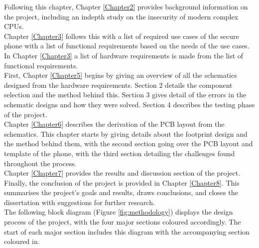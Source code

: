 Following this chapter, Chapter \ref{Chapter2} provides background information on the project, including an indepth study on the insecurity of modern complex CPUs.\\ 
Chapter \ref{Chapter3} follows this with a list of required use cases of the secure phone with a list of functional requirements based on the needs of the use cases.\\ 
In Chapter \ref{Chapter3} a list of hardware requirements is made from the list of functional requirements.\\
First, Chapter \ref{Chapter5} begins by giving an overview of all the schematics designed from the hardware requirements.
Section 2 details the component selection and the method behind this.
Section 3 gives detail of the errors in the schematic designs and how they were solved.
Section 4 describes the testing phase of the project.\\
Chapter \ref{Chapter6} describes the derivation of the PCB layout from the schematics.
This chapter starts by giving details about the footprint design and the method behind them, with the second section going over the PCB layout and template of the phone, with the third section detailing the challenges found throughout the process.\\
Chapter \ref{Chapter7} provides the results and discussion section of the project.\\
Finally, the conclusion of the project is provided in Chapter \ref{Chapter8}.
This summarises the project's goals and results, draws conclusions, and closes the dissertation with suggestions for further research.\\
The following block diagram (Figure \ref{fig:methodology}) displays the design process of the project, with the four major sections coloured accordingly. The start of each major section includes this diagram with the accompanying section coloured in. 

